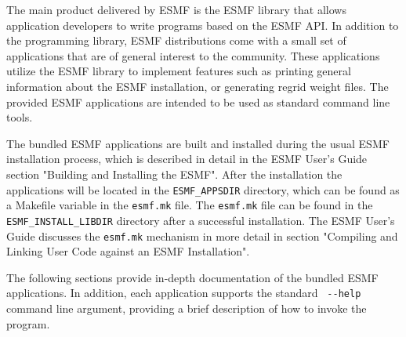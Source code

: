 

The main product delivered by ESMF is the ESMF library that allows application
developers to write programs based on the ESMF API. In addition to the 
programming library, ESMF distributions come with a small set of applications
that are of general interest to the community. These applications utilize
the ESMF library to implement features such as printing general information
about the ESMF installation, or generating regrid weight files. The provided
ESMF applications are intended to be used as standard command line tools.



The bundled ESMF applications are built and installed during the usual ESMF installation process, which is described in detail in the ESMF User's Guide section "Building and Installing the ESMF". After the installation the applications will be located in the {\tt ESMF\_APPSDIR} directory, which can be found as a Makefile variable in the {\tt esmf.mk} file. The {\tt esmf.mk} file can be found in the {\tt ESMF\_INSTALL\_LIBDIR} directory after a successful installation.  The ESMF User's Guide discusses the {\tt esmf.mk} mechanism in more detail in section "Compiling and Linking User Code against an ESMF Installation".

The following sections provide in-depth documentation of the bundled ESMF applications. In addition, each application supports the standard \verb+ --help + command line argument, providing a brief description of how to invoke the program.

